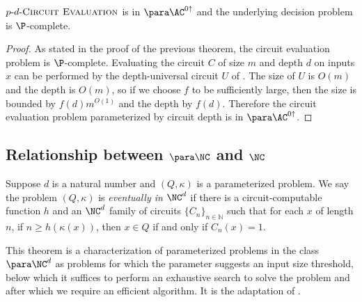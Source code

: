 \documentclass{article}
\newcommand{\dash}{\textnormal{-}}
\begin{document}
\begin{theorem}\label{thm:cvpdepth}
  $p \dash d \dash \textsc{Circuit Evaluation}$ is in $\para \AC^{0 \uparrow}$ and the underlying decision problem is $\P$-complete.
\end{theorem}
\begin{proof}
  As stated in the proof of the previous theorem, the circuit evaluation problem is $\P$-complete.
  Evaluating the circuit $C$ of size $m$ and depth $d$ on inputs $x$ can be performed by the depth-universal circuit $U$ of \autocite{ch85}.
  The size of $U$ is $O(m)$ and the depth is $O(m)$, so if we choose $f$ to be sufficiently large, then the size is bounded by $f(d) m^{O(1)}$ and the depth by $f(d)$.
  Therefore the circuit evaluation problem parameterized by circuit depth is in $\para \AC^{0 \uparrow}$.
\end{proof}

\subsection{Relationship between \texorpdfstring{$\para \NC$}{paraNC} and \texorpdfstring{$\NC$}{NC}}

\begin{definition}\label{def:eventually}
  Suppose $d$ is a natural number and $(Q, \kappa)$ is a parameterized problem.
  We say the problem $(Q, \kappa)$ is \emph{eventually in $\NC^d$} if there is a circuit-computable function $h$ and an $\NC^d$ family of circuits $\{C_n\}_{n \in \mathbb{N}}$ such that for each $x$ of length $n$, if $n \geq h(\kappa(x))$, then $x \in Q$ if and only if $C_n(x) = 1$.
\end{definition}

This theorem is a characterization of parameterized problems in the class $\para \NC^d$ as problems for which the parameter suggests an input size threshold, below which it suffices to perform an exhaustive search to solve the problem and after which we require an efficient algorithm.
It is the adaptation of \autocite[Theorem~1.37]{fg06}.
\end{document}
